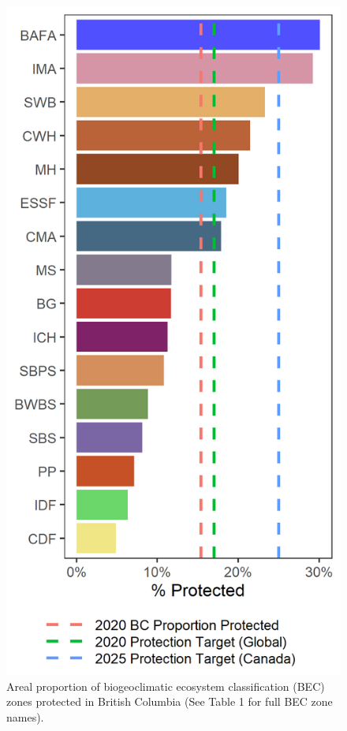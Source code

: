 \documentclass[11pt]{article}
\makeatletter
\def\maxwidth{\ifdim\Gin@nat@width>\linewidth\linewidth
\else\Gin@nat@width\fi}
\let\Oldincludegraphics\includegraphics
\renewcommand{\includegraphics}[1]{\Oldincludegraphics[width=\maxwidth]{#1}}
\makeatother
\begin{document}
\begin{figure}
\hypertarget{fig:bec-conch}{%
\centering
\includegraphics{figures/bec_bar.png}
\caption{Areal proportion of biogeoclimatic ecosystem classification
(BEC) zones protected in British Columbia (See Table 1 for full BEC zone
names).}\label{fig:bec-conch}
}
\end{figure}
\end{document}
